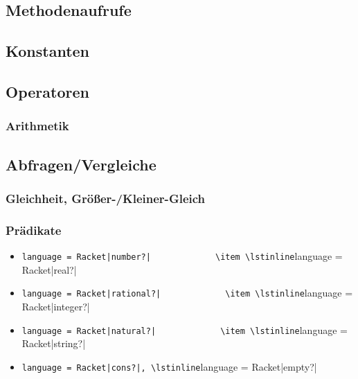 
\subsection{Methodenaufrufe}

\subsection{Konstanten}

\subsection{Operatoren}

	\subsubsection{Arithmetik}

\subsection{Abfragen/Vergleiche}

	\subsubsection{Gleichheit, Größer-/Kleiner-Gleich}
	
	\subsubsection{Prädikate}
		
		\begin{itemize}
			\item \lstinline[language = Racket|number?|
			\item \lstinline[language = Racket|real?|
			\item \lstinline[language = Racket|rational?|
			\item \lstinline[language = Racket|integer?|
			\item \lstinline[language = Racket|natural?|
			\item \lstinline[language = Racket|string?|
			\item \lstinline[language = Racket|cons?|, \lstinline[language = Racket|empty?|
		\end{itemize}
